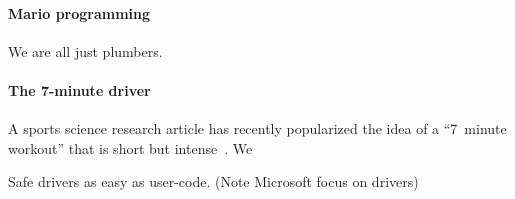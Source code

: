 \paragraph{Mario programming}
We are all just plumbers.

\paragraph{The 7-minute driver}
A sports science research article has recently popularized the idea of a
``7~minute workout'' that is short but intense~\cite{}.  We 


Safe drivers as easy as user-code.  (Note Microsoft focus on drivers)



